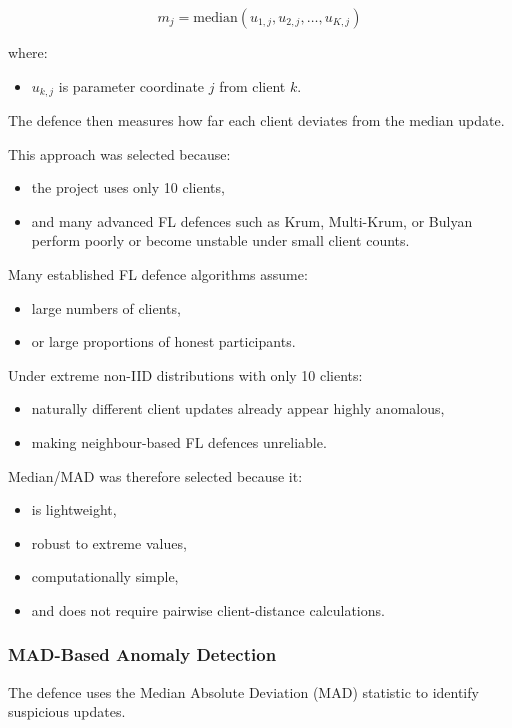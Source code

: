 \[
m_j
=
\text{median}
\left(
u_{1,j},
u_{2,j},
\dots,
u_{K,j}
\right)
\]

where:
\begin{itemize}
    \item $u_{k,j}$ is parameter coordinate $j$ from client $k$.
\end{itemize}

The defence then measures how far each client deviates from the median update.

This approach was selected because:
\begin{itemize}
    \item the project uses only 10 clients,
    \item and many advanced FL defences such as Krum, Multi-Krum, or Bulyan perform poorly or become unstable under small client counts.
\end{itemize}

Many established FL defence algorithms assume:
\begin{itemize}
    \item large numbers of clients,
    \item or large proportions of honest participants.
\end{itemize}

Under extreme non-IID distributions with only 10 clients:
\begin{itemize}
    \item naturally different client updates already appear highly anomalous,
    \item making neighbour-based FL defences unreliable.
\end{itemize}

Median/MAD was therefore selected because it:
\begin{itemize}
    \item is lightweight,
    \item robust to extreme values,
    \item computationally simple,
    \item and does not require pairwise client-distance calculations.
\end{itemize}

\subsubsection*{MAD-Based Anomaly Detection}

The defence uses the Median Absolute Deviation (MAD) statistic to identify suspicious updates.

